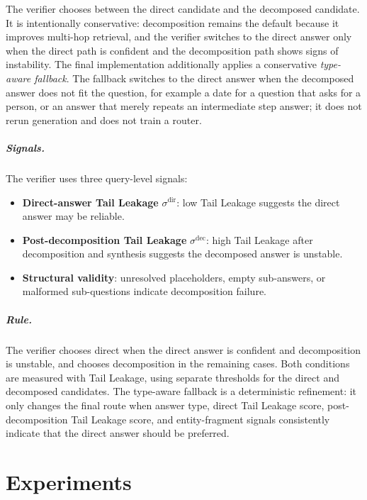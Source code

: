 \documentclass{nthu_thesis}
\begin{document}
\begin{thesiscjk}
The verifier chooses between the direct candidate and the decomposed candidate. It is intentionally conservative: decomposition remains the default because it improves multi-hop retrieval, and the verifier switches to the direct answer only when the direct path is confident and the decomposition path shows signs of instability. The final implementation additionally applies a conservative \emph{type-aware fallback}. The fallback switches to the direct answer when the decomposed answer does not fit the question, for example a date for a question that asks for a person, or an answer that merely repeats an intermediate step answer; it does not rerun generation and does not train a router.

\paragraph{Signals.} The verifier uses three query-level signals:

\begin{itemize}
    \item \textbf{Direct-answer Tail Leakage} $\sigma^{\mathrm{dir}}$: low Tail Leakage suggests the direct answer may be reliable.
    \item \textbf{Post-decomposition Tail Leakage} $\sigma^{\mathrm{dec}}$: high Tail Leakage after decomposition and synthesis suggests the decomposed answer is unstable.
    \item \textbf{Structural validity}: unresolved placeholders, empty sub-answers, or malformed sub-questions indicate decomposition failure.
\end{itemize}

\paragraph{Rule.} The verifier chooses direct when the direct answer is confident and decomposition is unstable, and chooses decomposition in the remaining cases. Both conditions are measured with Tail Leakage, using separate thresholds for the direct and decomposed candidates. The type-aware fallback is a deterministic refinement: it only changes the final route when answer type, direct Tail Leakage score, post-decomposition Tail Leakage score, and entity-fragment signals consistently indicate that the direct answer should be preferred.




\chapter{Experiments}
\label{ch:exp}


\end{thesiscjk}
\end{document}
